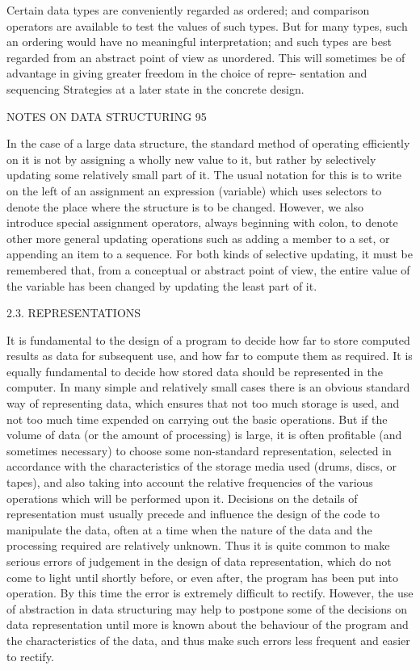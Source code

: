 Certain data types are conveniently regarded as ordered; and comparison operators are available to test the values of such types. But for many types, such an ordering would have no meaningful interpretation; and such types are best regarded from an abstract point of view as unordered. This will sometimes be of advantage in giving greater freedom in the choice of repre- sentation and sequencing Strategies at a later state in the concrete design.

NOTES ON DATA STRUCTURING 95

In the case of a large data structure, the standard method of operating efficiently on it is not by assigning a wholly new value to it, but rather by selectively updating some relatively small part of it. The usual notation for this is to write on the left of an assignment an expression (variable) which uses selectors to denote the place where the structure is to be changed. However, we also introduce special assignment operators, always beginning with colon, to denote other more general updating operations such as adding a member to a set, or appending an item to a sequence. For both kinds of selective updating, it must be remembered that, from a conceptual or abstract point of view, the entire value of the variable has been changed by updating the least part of it.

2.3. REPRESENTATIONS

It is fundamental to the design of a program to decide how far to store computed results as data for subsequent use, and how far to compute them as required. It is equally fundamental to decide how stored data should be represented in the computer. In many simple and relatively small cases there is an obvious standard way of representing data, which ensures that not too much storage is used, and not too much time expended on carrying out the basic operations. But if the volume of data (or the amount of processing) is large, it is often profitable (and sometimes necessary) to choose some non-standard representation, selected in accordance with the characteristics of the storage media used (drums, discs, or tapes), and also taking into account the relative frequencies of the various operations which will be performed upon it. Decisions on the details of representation must usually precede and influence the design of the code to manipulate the data, often at a time when the nature of the data and the processing required are relatively unknown. Thus it is quite common to make serious errors of judgement in the design of data representation, which do not come to light until shortly before, or even after, the program has been put into operation. By this time the error is extremely difficult to rectify. However, the use of abstraction in data structuring may help to postpone some of the decisions on data representation until more is known about the behaviour of the program and the characteristics of the data, and thus make such errors less frequent and easier to rectify.

